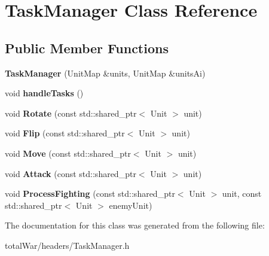 \hypertarget{class_task_manager}{}\section{Task\+Manager Class Reference}
\label{class_task_manager}
\subsection*{Public Member Functions}
\begin{DoxyCompactItemize}
\item 
\mbox{\label{class_task_manager_a626c0adcab5e727f6e51c8ad0ff01f2f}} 
{\bfseries Task\+Manager} (Unit\+Map \&units, Unit\+Map \&units\+Ai)
\item 
\mbox{\label{class_task_manager_ae35595cceee61e64ca700b2d612a3178}} 
void {\bfseries handle\+Tasks} ()
\item 
\mbox{\label{class_task_manager_afc662c4e65435104409f32673b199257}} 
void {\bfseries Rotate} (const std\+::shared\+\_\+ptr$<$ Unit $>$ unit)
\item 
\mbox{\label{class_task_manager_a43a63b489ae3a05488003eaf472675ad}} 
void {\bfseries Flip} (const std\+::shared\+\_\+ptr$<$ Unit $>$ unit)
\item 
\mbox{\label{class_task_manager_a937275dac3998691a5bc4c38e05cc4f8}} 
void {\bfseries Move} (const std\+::shared\+\_\+ptr$<$ Unit $>$ unit)
\item 
\mbox{\label{class_task_manager_a14dfdb4100b5f9f08052336765c51e3e}} 
void {\bfseries Attack} (const std\+::shared\+\_\+ptr$<$ Unit $>$ unit)
\item 
\mbox{\label{class_task_manager_a8a30e6691ea5b37b0b0b00deb6a7c352}} 
void {\bfseries Process\+Fighting} (const std\+::shared\+\_\+ptr$<$ Unit $>$ unit, const std\+::shared\+\_\+ptr$<$ Unit $>$ enemy\+Unit)
\end{DoxyCompactItemize}


The documentation for this class was generated from the following file\+:\begin{DoxyCompactItemize}
\item 
total\+War/headers/Task\+Manager.\+h\end{DoxyCompactItemize}
